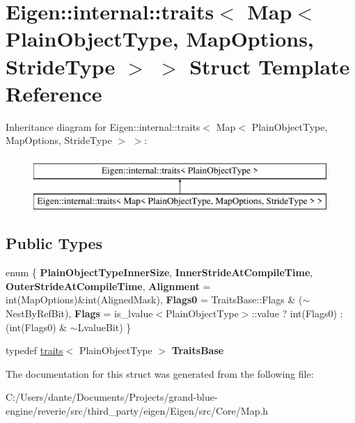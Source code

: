 \hypertarget{struct_eigen_1_1internal_1_1traits_3_01_map_3_01_plain_object_type_00_01_map_options_00_01_stride_type_01_4_01_4}{}\section{Eigen\+::internal\+::traits$<$ Map$<$ Plain\+Object\+Type, Map\+Options, Stride\+Type $>$ $>$ Struct Template Reference}
\label{struct_eigen_1_1internal_1_1traits_3_01_map_3_01_plain_object_type_00_01_map_options_00_01_stride_type_01_4_01_4}
Inheritance diagram for Eigen\+::internal\+::traits$<$ Map$<$ Plain\+Object\+Type, Map\+Options, Stride\+Type $>$ $>$\+:\begin{figure}[H]
\begin{center}
\leavevmode
\includegraphics[height=2.000000cm]{struct_eigen_1_1internal_1_1traits_3_01_map_3_01_plain_object_type_00_01_map_options_00_01_stride_type_01_4_01_4}
\end{center}
\end{figure}
\subsection*{Public Types}
\begin{DoxyCompactItemize}
\item 
\mbox{\label{struct_eigen_1_1internal_1_1traits_3_01_map_3_01_plain_object_type_00_01_map_options_00_01_stride_type_01_4_01_4_a10fd95b5febd12942b5eeaac13925ea3}} 
enum \{ \newline
{\bfseries Plain\+Object\+Type\+Inner\+Size}, 
{\bfseries Inner\+Stride\+At\+Compile\+Time}, 
{\bfseries Outer\+Stride\+At\+Compile\+Time}, 
{\bfseries Alignment} = int(Map\+Options)\&int(Aligned\+Mask), 
\newline
{\bfseries Flags0} = Traits\+Base\+::Flags \& ($\sim$\+Nest\+By\+Ref\+Bit), 
{\bfseries Flags} = is\+\_\+lvalue$<$Plain\+Object\+Type$>$\+::value ? int(Flags0) \+: (int(Flags0) \& $\sim$\+Lvalue\+Bit)
 \}
\item 
\mbox{\label{struct_eigen_1_1internal_1_1traits_3_01_map_3_01_plain_object_type_00_01_map_options_00_01_stride_type_01_4_01_4_a90f1edf2f2637a65bed060bb57b0c43e}} 
typedef \mbox{\hyperlink{struct_eigen_1_1internal_1_1traits}{traits}}$<$ Plain\+Object\+Type $>$ {\bfseries Traits\+Base}
\end{DoxyCompactItemize}


The documentation for this struct was generated from the following file\+:\begin{DoxyCompactItemize}
\item 
C\+:/\+Users/dante/\+Documents/\+Projects/grand-\/blue-\/engine/reverie/src/third\+\_\+party/eigen/\+Eigen/src/\+Core/Map.\+h\end{DoxyCompactItemize}
